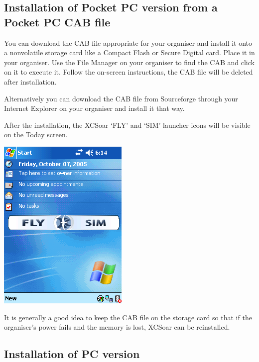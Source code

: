\subsection*{Installation of Pocket PC version from a Pocket PC CAB file}

You can download the CAB file appropriate for your organiser and
install it onto a nonvolatile storage card like a Compact Flash or
Secure Digital card. Place it in your organiser. Use the File Manager
on your organiser to find the CAB and click on it to execute
it. Follow the on-screen instructions, the CAB file will be deleted
after installation.

Alternatively you can download the CAB file from Sourceforge through
your Internet Explorer on your organiser and install it that way.

After the installation, the XCSoar `FLY' and `SIM' launcher icons will
be visible on the Today screen.

\begin{center}
\includegraphics[angle=0,width=0.6\linewidth,keepaspectratio='true']{figures/XCS_Today.png}
\end{center}

\tip It is generally a good idea to keep the CAB file on the storage card
so that if the organiser's power fails and the memory is lost, XCSoar
can be reinstalled.

\subsection*{Installation of PC version}

